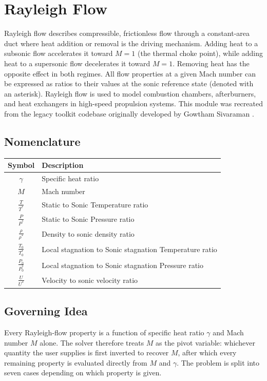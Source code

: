\chapter{Rayleigh Flow}

Rayleigh flow describes compressible, frictionless flow through a constant-area duct where heat addition or removal is the driving mechanism. Adding heat to a subsonic flow accelerates it toward $M = 1$ (the thermal choke point), while adding heat to a supersonic flow decelerates it toward $M = 1$. Removing heat has the opposite effect in both regimes. All flow properties at a given Mach number can be expressed as ratios to their values at the sonic reference state (denoted with an asterisk). Rayleigh flow is used to model combustion chambers, afterburners, and heat exchangers in high-speed propulsion systems. This module was recreated from the legacy toolkit codebase originally developed by Gowtham Sivaraman \cite{sivaraman2015}.

\section{Nomenclature}

\begin{center}
\begin{tabular}{@{}cl@{}}
\toprule
Symbol & Description \\
\midrule
$\gamma$ & Specific heat ratio \\
$M$ & Mach number \\
$\frac{T}{T^*}$ & Static to Sonic Temperature ratio \\
$\frac{P}{P^*}$ & Static to Sonic Pressure ratio \\
$\frac{\rho}{\rho^*}$ & Density to sonic density ratio \\
$\frac{T_0}{T_0^*}$ & Local stagnation to Sonic stagnation Temperature ratio \\
$\frac{P_0}{P_0^*}$ & Local stagnation to Sonic stagnation Pressure ratio \\
$\frac{U}{U^*}$ & Velocity to sonic velocity ratio \\
\bottomrule
\end{tabular}
\end{center}

\section{Governing Idea}

Every Rayleigh-flow property is a function of specific heat ratio $\gamma$ and Mach number $M$ alone. The solver therefore treats $M$ as the pivot variable: whichever quantity the user supplies is first inverted to recover $M$, after which every remaining property is evaluated directly from $M$ and $\gamma$. The problem is split into seven cases depending on which property is given.

